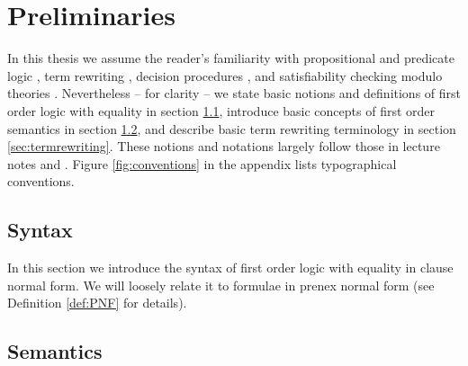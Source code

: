 
\chapter{Preliminaries}



In this thesis we assume the reader's familiarity with 
propositional and predicate logic \cite{Huth:2004:LCS:975331}, 
term rewriting \cite{Baader:1998:TR:280474}, 
decision procedures \cite{Kroening:2008:DPA:1391237}, 
and satisfiability checking modulo theories \cite{Biere:2009:HSV:1550723}.
Nevertheless -- for clarity -- we state basic notions and  definitions 
of first order logic with equality in section \ref{sec:syntax},
introduce basic concepts of first order semantics in section \ref{sec:semantics},
and describe basic term rewriting terminology in section \ref{sec:termrewriting}. 
These notions and notations largely follow those in lecture notes \cite{AM2015tr} and \cite{GM2013ar}.
Figure \vref{fig:conventions} in the appendix lists typographical conventions.


\section{Syntax}\label{sec:syntax}

In this section we introduce the syntax of first order logic with equality in clause normal form.
We will loosely relate it to formulae in prenex normal form (see Definition \ref{def:PNF} for details).



















\section{Semantics}\label{sec:semantics}

